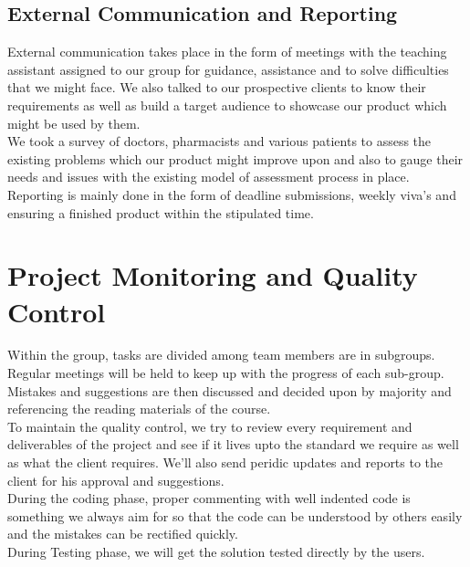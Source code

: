 \documentclass[
10pt, %
a4paper, %
oneside, %
headinclude,footinclude, %
BCOR5mm, %
]{scrartcl}
\begin{document}
\subsection{External Communication and Reporting}

External communication takes place in the form of  meetings with the teaching assistant assigned to our group for guidance, assistance and to solve difficulties that we might face. We also talked to our prospective clients to know their requirements as well as build a target audience to showcase our product which might be used by them.
\\We took a survey of doctors, pharmacists and various patients  to assess the existing problems which our product might improve upon and also to gauge their needs and issues with the existing model of assessment process in place.
\\Reporting is mainly done in the form of deadline submissions, weekly viva’s and ensuring a finished product within the stipulated time.

\section{Project Monitoring and Quality Control}
Within the group, tasks are divided among team members are in subgroups. Regular meetings will be held to keep up with the progress of each sub-group. Mistakes and suggestions are then discussed and decided upon by majority and referencing the reading materials of the course.
\\To maintain the quality control, we try to review every requirement and deliverables of the project and see if it lives upto the standard we require as well as what the client requires. We'll also send peridic updates and reports to the client for his approval and suggestions.
\\During the coding phase, proper commenting with well indented code is something we always aim for so that the code can be understood by others easily and the mistakes can be rectified quickly.
\\During Testing phase, we will get the solution tested directly by the users.
\end{document}
